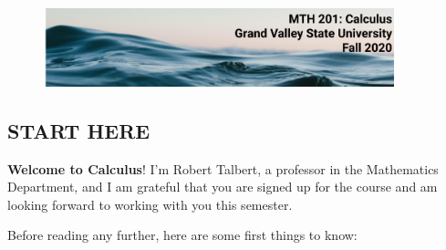 \documentclass[]{article}
\date{}
\begin{document}
\begin{figure}
\centering
\includegraphics[width=4in]{Calculus-course-header.png}
\end{figure}

\hypertarget{start-here}{%
\subsection{START HERE}\label{start-here}}

\textbf{Welcome to Calculus}! I'm Robert Talbert, a professor in the
Mathematics Department, and I am grateful that you are signed up for the
course and am looking forward to working with you this semester.

Before reading any further, here are some first things to know:
\end{document}

